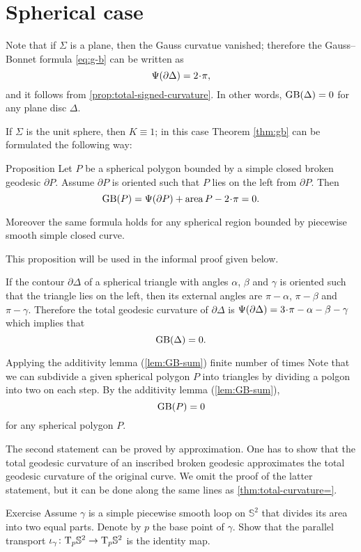 \section{Spherical case}

Note that if $\Sigma$ is a plane, then the Gauss curvatue vanished;
therefore the Gauss--Bonnet formula \ref{eq:g-b} can be written as 
\[\tgc{\partial\Delta}=2\cdot \pi,\]
and it follows from \ref{prop:total-signed-curvature}.
In other words, $\mathop{\rm GB}\nolimits(\Delta)=0$ for any plane disc $\Delta$.

If $\Sigma$ is the unit sphere, then $K\equiv1$;
in this case Theorem \ref{thm:gb} can be formulated the following way:

\begin{thm}{Proposition}\label{prop:area-of-spher-polygon}
Let $P$ be a spherical polygon bounded by a simple closed broken geodesic $\partial P$.
Assume $\partial P$ is oriented such that $P$ lies on the left from $\partial P$.
Then 
\[\GB(P)=\tgc{\partial P}+\area P-2\cdot \pi=0.\]

Moreover the same formula holds for any spherical region bounded by piecewise smooth simple closed curve.
\end{thm}

This proposition will be used in the informal proof given below.

If the contour $\partial\Delta$ of a spherical triangle with angles $\alpha$, $\beta$ and $\gamma$ is oriented such that the triangle lies on the left, then its external angles are  $\pi-\alpha$, $\pi-\beta$ and $\pi-\gamma$.
Therefore the total geodesic curvature of $\partial\Delta$ is $\tgc{\partial\Delta}=3\cdot\pi-\alpha-\beta-\gamma$
which implies that
\[\mathop{\rm GB}\nolimits(\Delta)=0.\]

Applying the additivity lemma (\ref{lem:GB-sum}) finite number of times 
Note that we can subdivide a given spherical polygon $P$ into triangles by dividing a polgon into two on each step.
By the additivity lemma (\ref{lem:GB-sum}),
\[\mathop{\rm GB}\nolimits(P)=0\]
for any spherical polygon $P$.

The second statement can be proved by approximation. One has to show that the total geodesic curvature of an inscribed broken geodesic approximates the total geodesic curvature of the original curve.
We omit the proof of the latter statement, but it can be done along the same lines as \ref{thm:total-curvature=}.
\qeds


\begin{thm}{Exercise}\label{ex:half-sphere-total-curvature}
Assume $\gamma$ is a simple piecewise smooth loop on $\mathbb{S}^2$ that divides its area into two equal parts.
Denote by $p$ the base point of $\gamma$.
Show that the parallel transport $\iota_\gamma\colon\mathrm{T}_p\mathbb{S}^2\to\mathrm{T}_p\mathbb{S}^2$ is the identity map.
\end{thm}



